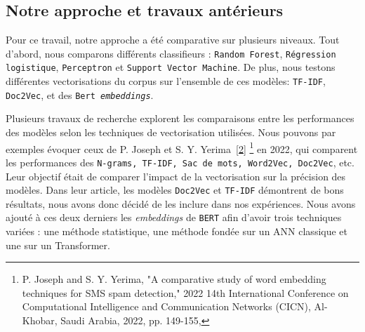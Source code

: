 \subsection{Notre approche et travaux antérieurs}

Pour ce travail, notre approche a été comparative sur plusieurs niveaux. Tout d'abord, nous comparons différents classifieurs : \texttt{Random Forest}, \texttt{Régression logistique}, \texttt{Perceptron} et \texttt{Support Vector Machine}. De plus, nous testons différentes vectorisations du corpus sur l'ensemble de ces modèles: \texttt{TF-IDF}, \texttt{Doc2Vec}, et des \texttt{Bert \textit{embeddings}}.


\par Plusieurs travaux de recherche explorent les comparaisons entre les performances des modèles selon les techniques de vectorisation utilisées. Nous pouvons par exemples évoquer ceux de P. Joseph et S. Y. Yerima~\hyperlink{ref2}{[2]} \footnote{P. Joseph and S. Y. Yerima, "A comparative study of word embedding techniques for SMS spam detection," 2022 14th International Conference on Computational Intelligence and Communication Networks (CICN), Al-Khobar, Saudi Arabia, 2022, pp. 149-155,} en 2022, qui comparent les performances des \texttt{N-grams, TF-IDF, Sac de mots, Word2Vec, Doc2Vec}, etc. Leur objectif était de comparer l'impact de la vectorisation sur la précision des modèles. Dans leur article, les modèles \texttt{Doc2Vec} et \texttt{TF-IDF} démontrent de bons résultats, nous avons donc décidé de les inclure dans nos expériences. Nous avons ajouté à ces deux derniers les \textit{embeddings} de \texttt{BERT} afin d'avoir trois techniques variées : une méthode statistique, une méthode fondée sur un ANN classique et une sur un Transformer.
